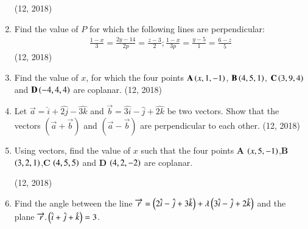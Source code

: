\begin{enumerate}[label=\thesubsection.\arabic*, ref=\thesubsection.\theenumi]
\hfill (12, 2018)
\item Find the value of $P$ for which the following lines are perpendicular:
 \begin{align*}
 \frac{1-x}{3}=\frac{2y-14}{2p}=\frac{z-3}{2}; \frac{1-x}{3p}=\frac{y-5}{1}=\frac{6-z}{5}
 \end{align*}
 \hfill (12, 2018)
\item Find the value of $x$, for which the four points $\mathbf{A}\left(x,1,-1\right)$, $\mathbf{B}\left(4,5,1\right)$, $\mathbf{C}\left(3,9,4\right)$ and $\mathbf{D}\left(-4,4,4\right)$ are coplanar.
\hfill (12, 2018)
\item Let $\vec{a}=\hat{i}+\hat{2j}-\hat{3k}$ and $\vec{b}=\hat{3i}-\hat{j}+\hat{2k}$ be two vectors. Show that the vectors $(\vec{a}+\vec{b})$ and $(\vec{a}-\vec{b})$ are perpendicular to each other.
\hfill (12, 2018)
\item Using vectors, find the value of $x$ such that the four points $\mathbf{A}$ $\left(x,5,-1\right)$,$\mathbf{B}$ $\left(3,2,1\right)$,$\mathbf{C}$ $\left(4,5,5\right)$ and $\mathbf{D}$ $\left(4,2,-2\right)$ are coplanar.

\hfill (12, 2018) 
\item Find the angle between the line $\overrightarrow{r}=\left(2\hat{i}-\hat{j}+3\hat{k}\right)+\lambda\left(3\hat{i}-\hat{j}+2\hat{k}\right)$ and the plane $\overrightarrow{r}.\left(\hat{i}+\hat{j}+\hat{k}\right)=3$.


\end{enumerate}
